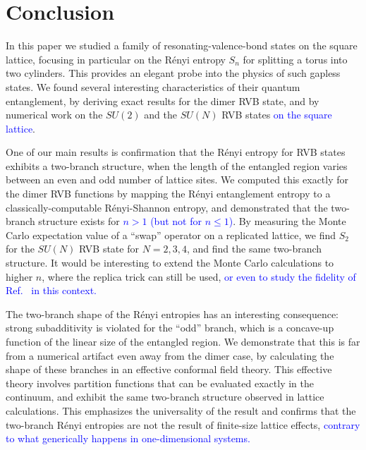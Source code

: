 \documentclass[11pt]{iopart}
\begin{document}
\section{Conclusion} 
\label{sec:conclusion}


In this paper we studied a family of resonating-valence-bond states on the square lattice, focusing in particular on the R\'enyi entropy $S_n$ for splitting a torus into two cylinders. This provides an elegant probe into the physics of such gapless states. We found several interesting characteristics of their quantum entanglement, by deriving exact results for the dimer RVB state, and by numerical work on the $SU(2)$ and the $SU(N)$ RVB states \textcolor{blue}{on the square lattice}. 

One of our main results is confirmation that the R\'enyi entropy for RVB states exhibits a two-branch structure, when the length of the entangled region varies between an even and odd number of lattice sites. We computed this exactly for the dimer RVB functions by mapping the R\'enyi entanglement entropy to a classically-computable R\'enyi-Shannon entropy, and demonstrated that the two-branch structure exists for \textcolor{blue}{$n>1$ (but not for $n\leq 1$)}.
By measuring the Monte Carlo expectation value of a ``swap'' operator on a replicated lattice, we find $S_2$ for the $SU(N)$ RVB state for $N=2,3,4$, and find the same two-branch structure. It would be interesting to extend the Monte Carlo calculations to higher $n$, where the replica trick can still be used, \textcolor{blue}{or even to study the fidelity of Ref.~\cite{Bipartite_fidelity} in this context.} 

The two-branch shape of the R\'enyi entropies has an interesting consequence:  strong subadditivity is violated for the ``odd'' branch, which is a concave-up function of the linear size of the entangled region.  We demonstrate that this is far from a numerical artifact even away from the dimer case, by calculating the shape of these branches in an effective conformal field theory.  This effective theory involves partition functions that can be evaluated exactly in the continuum, and exhibit the same two-branch structure observed in lattice calculations.  This emphasizes the universality of the result and confirms that the two-branch R\'enyi entropies are not the result of finite-size lattice effects, \textcolor{blue}{contrary to what generically happens in one-dimensional systems\cite{Corrections_scaling1,Corrections_scaling2}.} 
\end{document}
